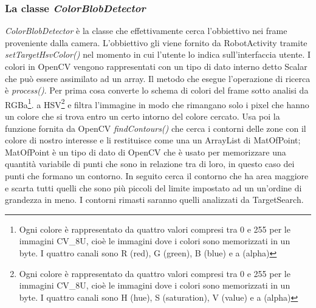 \subsubsection{La classe \emph{ColorBlobDetector}}
\emph{ColorBlobDetector} è la classe che effettivamente cerca l'obbiettivo nei
frame proveniente dalla camera. L'obbiettivo gli viene fornito da RobotActivity 
tramite \emph{setTargetHsvColor()} nel momento in cui l'utente lo indica 
sull'interfaccia utente. I colori in OpenCV vengono rappresentati con un tipo di dato interno
detto Scalar che può essere assimilato ad un array. Il metodo che esegue 
l'operazione di ricerca è \emph{process()}. Per prima cosa converte lo schema di 
colori del frame sotto analisi da RGBa\footnote{Ogni colore è rappresentato da 
quattro valori compresi tra 0 e 255 per le immagini CV\_8U, cioè le immagini dove 
i colori sono memorizzati in un byte. I quattro canali sono R (red), G (green), 
B (blue) e a (alpha) }. a HSV\footnote{Ogni colore è rappresentato da quattro 
valori compresi tra 0 e 255 per le immagini CV\_8U, cioè le immagini dove 
i colori sono memorizzati in un byte. I quattro canali sono H (hue), S (saturation), 
V (value) e  a (alpha)} e filtra l'immagine in modo che rimangano solo 
i pixel che hanno un colore che si trova entro un certo intorno del colore cercato.
Usa poi la funzione fornita da OpenCV \emph{findContours()} che cerca i contorni delle
zone con il colore di nostro interesse e li restituisce come una un ArrayList di MatOfPoint;
MatOfPoint è un tipo di dato di OpenCV che è usato per memorizzare una quantità variabile
di punti che sono in relazione tra di loro, in questo caso dei punti che formano un contorno.
In seguito cerca il contorno che ha area maggiore e scarta tutti quelli che sono più piccoli 
del limite impostato ad un un'ordine di grandezza in meno. I contorni rimasti 
saranno quelli analizzati da TargetSearch.


